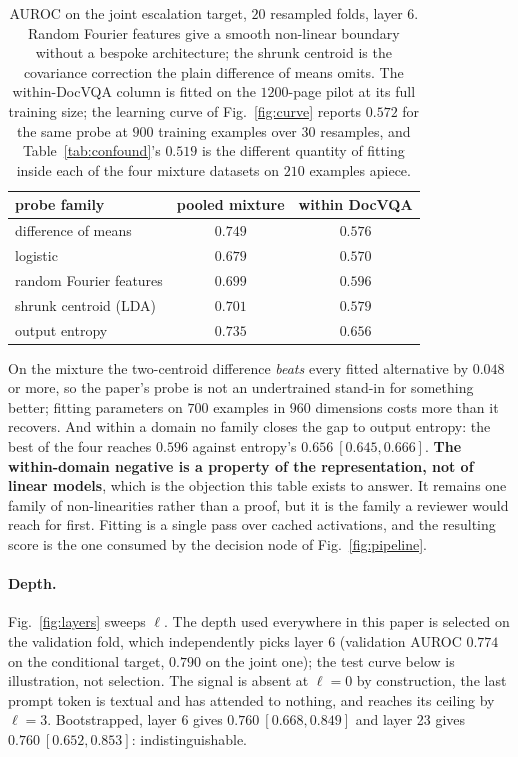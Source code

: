 \documentclass[10pt,twocolumn]{article}
\theoremstyle{plain}
\begin{document}
\begin{table}[t]
\centering\small
\setlength{\tabcolsep}{4pt}
\begin{tabular}{lcc}
\toprule
probe family & pooled mixture & within DocVQA \\
\midrule
difference of means & $\mathbf{0.749}$ & $0.576$ \\
logistic & $0.679$ & $0.570$ \\
random Fourier features & $0.699$ & $0.596$ \\
shrunk centroid (LDA) & $0.701$ & $0.579$ \\
\midrule
output entropy & $0.735$ & $\mathbf{0.656}$ \\
\bottomrule
\end{tabular}
\caption{AUROC on the joint escalation target, $20$ resampled folds, layer 6.
Random Fourier features give a smooth non-linear boundary without a bespoke
architecture; the shrunk centroid is the covariance correction the plain
difference of means omits. The within-DocVQA column is fitted on the
$1200$-page pilot at its full training size; the learning curve of
Fig.~\ref{fig:curve} reports $0.572$ for the same probe at $900$ training
examples over $30$ resamples, and Table~\ref{tab:confound}'s $0.519$ is the
different quantity of fitting inside each of the four mixture datasets on $210$
examples apiece.}
\label{tab:family}
\end{table}

On the mixture the two-centroid difference \emph{beats} every fitted
alternative by $0.048$ or more, so the
paper's probe is not an undertrained stand-in for something better; fitting
parameters on $700$ examples in $960$ dimensions costs more than it recovers.
And within a domain no family closes the gap to output entropy: the best of the
four reaches $0.596$ against entropy's $0.656\ [0.645, 0.666]$. \textbf{The
within-domain negative is a property of the representation, not of linear
models}, which is the objection this table exists to answer. It remains one
family of non-linearities rather than a proof, but it is the family a reviewer
would reach for first. Fitting is a single
pass over cached activations, and the resulting score is the one consumed by the
decision node of Fig.~\ref{fig:pipeline}.

\paragraph{Depth.} Fig.~\ref{fig:layers} sweeps $\ell$. The depth used
everywhere in this paper is selected on the validation fold, which independently
picks layer 6 (validation AUROC $0.774$ on the conditional target, $0.790$ on
the joint one); the test curve below is illustration, not selection. The signal is absent at
$\ell=0$ by construction, the last prompt token is textual and has attended to nothing, and reaches its ceiling by $\ell=3$. Bootstrapped, layer 6 gives
$0.760\ [0.668, 0.849]$ and layer 23 gives $0.760\ [0.652, 0.853]$:
indistinguishable.
\end{document}
